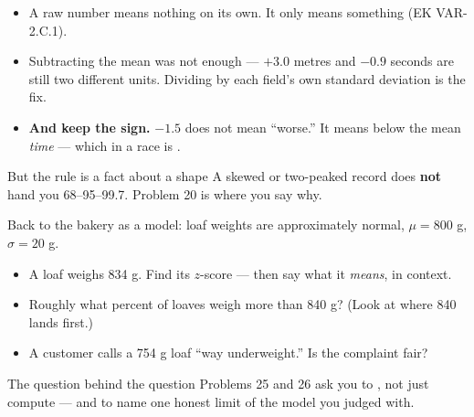 \documentclass[aspectratio=169, 11pt]{beamer}
\begin{document}
\begin{frame}[t, plain]
  \vspace{6pt}
  \begin{itemize}\setlength{\itemsep}{8pt}
    \item A raw number means nothing on its own. It only means something  (EK VAR-2.C.1).
    \item Subtracting the mean was not enough --- $+3.0$ metres and $-0.9$ seconds are still two
          different units. Dividing by each field's own standard deviation is the fix.
    \item \textbf{And keep the sign.} $-1.5$ does not mean ``worse.'' It means below the mean
          \emph{time} --- which in a race is .
  \end{itemize}
  \vspace{8pt}
  \begin{block}{But the rule is a fact about a shape}
    A skewed or two-peaked record does \textbf{not} hand you 68--95--99.7. Problem 20 is where
    you say why.
  \end{block}
\end{frame}

\begin{frame}[t, plain]
  Back to the bakery as a model: loaf weights are approximately normal, $\mu = 800$ g,
  $\sigma = 20$ g.
  \begin{itemize}\setlength{\itemsep}{5pt}
    \item A loaf weighs 834 g. Find its $z$-score --- then say what it \emph{means}, in context.
    \item Roughly what percent of loaves weigh more than 840 g? (Look at where 840 lands first.)
    \item A customer calls a 754 g loaf ``way underweight.'' Is the complaint fair?
  \end{itemize}
  \begin{block}{The question behind the question}
    Problems 25 and 26 ask you to , not just compute --- and to name one honest
    limit of the model you judged with.
  \end{block}
\end{frame}
\end{document}
